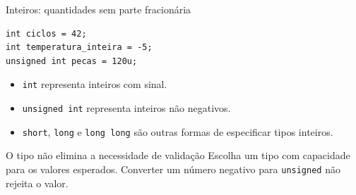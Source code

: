\begin{frame}[fragile]{Inteiros: quantidades sem parte fracionária}
\begin{lstlisting}
int ciclos = 42;
int temperatura_inteira = -5;
unsigned int pecas = 120u;
\end{lstlisting}
\begin{itemize}
\item \texttt{int} representa inteiros com sinal.
\item \texttt{unsigned int} representa inteiros não negativos.
\item \texttt{short}, \texttt{long} e \texttt{long long} são outras formas de especificar tipos inteiros.
\end{itemize}
\begin{alertblock}{O tipo não elimina a necessidade de validação}
Escolha um tipo com capacidade para os valores esperados. Converter um número negativo para \texttt{unsigned} não rejeita o valor.
\end{alertblock}
\end{frame}
